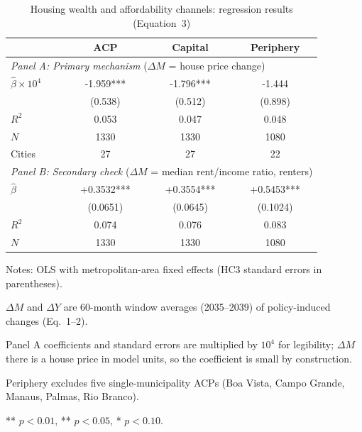 \begin{table}[htbp]
\centering
\caption{Housing wealth and affordability channels: regression results (Equation~3)}
\label{tab:regression}
\begin{threeparttable}
\begin{tabular}{lccc}
\toprule
 & ACP & Capital & Periphery \\
\midrule
\multicolumn{4}{l}{\textit{Panel A: Primary mechanism} ($\Delta M$ = house price change)} \\[2pt]
$\hat{\beta} \times 10^{4}$ & -1.959*** & -1.796*** & -1.444 \\
 & (0.538) & (0.512) & (0.898) \\[4pt]
$R^2$ & 0.053 & 0.047 & 0.048 \\
$N$ & 1330 & 1330 & 1080 \\
Cities & 27 & 27 & 22 \\
\midrule
\multicolumn{4}{l}{\textit{Panel B: Secondary check} ($\Delta M$ = median rent/income ratio, renters)} \\[2pt]
$\hat{\beta}$ & +0.3532*** & +0.3554*** & +0.5453*** \\
 & (0.0651) & (0.0645) & (0.1024) \\[4pt]
$R^2$ & 0.074 & 0.076 & 0.083 \\
$N$ & 1330 & 1330 & 1080 \\
\bottomrule
\end{tabular}
\begin{tablenotes}
\footnotesize
\item Notes: OLS with metropolitan-area fixed effects (HC3 standard errors in parentheses).
\item $\Delta M$ and $\Delta Y$ are 60-month window averages (2035--2039) of policy-induced changes (Eq.~1--2).
\item Panel A coefficients and standard errors are multiplied by $10^{4}$ for legibility; $\Delta M$ there is a house price in model units, so the coefficient is small by construction.
\item Periphery excludes five single-municipality ACPs (Boa Vista, Campo Grande, Manaus, Palmas, Rio Branco).
\item *** $p<0.01$, ** $p<0.05$, * $p<0.10$.
\end{tablenotes}
\end{threeparttable}
\end{table}